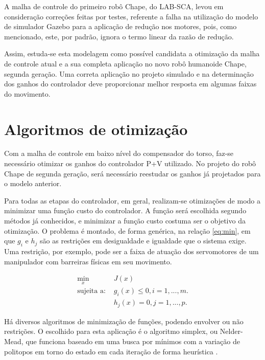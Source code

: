 A malha de controle do primeiro robô Chape, do LAB-SCA, levou em consideração correções feitas por testes, referente a falha na utilização do modelo de simulador Gazebo para a aplicação de redução nos motores, pois, como mencionado, este, por padrão, ignora o termo linear da razão de redução.

Assim, estuda-se esta modelagem como possível candidata a otimização da malha de controle atual e a sua completa aplicação no novo robô humanoide Chape, segunda geração. Uma correta aplicação no projeto simulado e na determinação dos ganhos do controlador deve proporcionar melhor resposta em algumas faixas do movimento.

\section{Algoritmos de otimização}

Com a malha de controle em baixo nível do compensador do torso, faz-se necessário otimizar os ganhos do controlador P+V utilizado. No projeto do robô Chape de segunda geração, será necessário reestudar os ganhos já projetados para o modelo anterior.

Para todas as etapas do controlador, em geral, realizam-se otimizações de modo a minimizar uma função custo do controlador. A função será escolhida segundo métodos já conhecidos, e minimizar a função custo costuma ser o objetivo da otimização. O problema é montado, de forma genérica, na relação \eqref{eq:min}, em que $g_i$ e $h_j$ são as restrições em desigualdade e igualdade que o sistema exige. Uma restrição, por exemplo, pode ser a faixa de atuação dos servomotores de um manipulador com barreiras físicas em seu movimento.

\begin{equation}
\label{eq:min}
\begin{aligned}
\underset{x}{\min} & J(x)\\
\text{sujeita a: } & g_i(x) \leq 0, i = 1, ..., m.\\
& h_j(x) = 0, j = 1,...,p. 
\end{aligned}
\end{equation}

Há diversos algoritmos de minimização de funções, podendo envolver ou não restrições. O escolhido para esta aplicação é o algoritmo simplex, ou Nelder-Mead, que funciona baseado em uma busca por mínimos com a variação de politopos em torno do estado em cada iteração de forma heurística \cite{NoceWrig06}.

